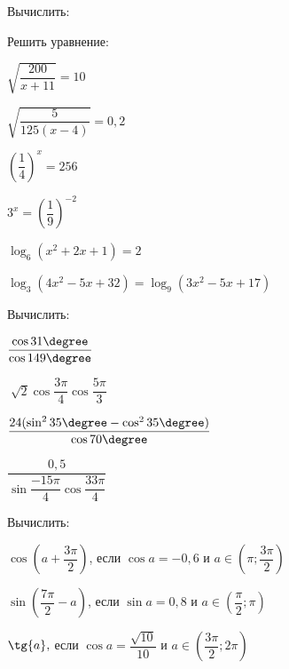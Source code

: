 \newpage
{}
\begin{listofex}
	\item Вычислить:
	\begin{enumcols}[itemcolumns=2]
		\item {}
		\item {}
		\item {}
		\item {}
		\item {}
		\item {}
	\end{enumcols}
	\item Решить уравнение:
	\begin{enumcols}[itemcolumns=2]
		\item \( \sqrt{\dfrac{200}{x+11}}=10 \)
		\item \( \sqrt{\dfrac{5}{125(x-4)}}=0,2 \)
		\item \( \left( \dfrac{1}{4} \right)^{x}=256 \)
		\item \(  3^{x}=\left( \dfrac{1}{9} \right)^{-2} \)
		\item \( \log_6(x^2+2x+1)=2 \)
		\item \( \log_3(4x^2-5x+32)=\log_9(3x^2-5x+17) \)
	\end{enumcols}
	\item Вычислить:
	\begin{enumcols}[itemcolumns=2]
		\item \(\dfrac{\cos{31\degree}}{\cos{149\degree}} \)
		\item \(\sqrt[]{2} \cos{\dfrac{3\pi}{4}} \cos{\dfrac{5\pi}{3}} \)
		\item \(\dfrac{24(\sin^2{35\degree}-\cos^2{35\degree})}{\cos{70\degree}} \)
		\item \(\dfrac{0,5}{\sin{\dfrac{-15\pi}{4}}\cos{\dfrac{33\pi}{4}}} \)
	\end{enumcols}
	\item Вычислить:
	\begin{enumcols}[itemcolumns=1]
		\item \( \cos\left(a+{\dfrac{3\pi}{2}}\right) \), если \( \cos{a} = -0,6 \) и \(a \in \left( \pi;\dfrac{3\pi}{2} \right) \)
		\item \( \sin\left({\dfrac{7\pi}{2}-a}\right) \), если \( \sin{a} = 0,8 \) и \(a\in\left( \dfrac{\pi}{2};\pi \right) \)
		\item \( \tg{a},\) если \( \cos{a} = \dfrac{\sqrt{10}}{10} \) и \(a\in\left( \dfrac{3\pi}{2};2\pi \right) \)

\end{enumcols}
\end{listofex}
